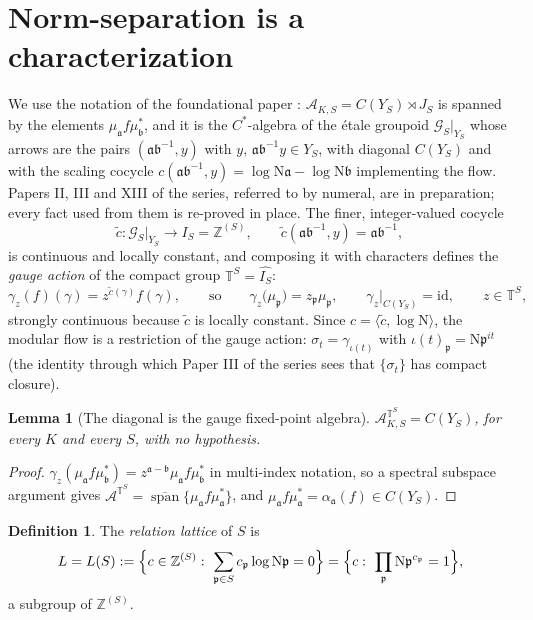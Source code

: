 \documentclass[11pt]{amsart}
\numberwithin{equation}{section}
\newtheorem{lemma}[theorem]{Lemma}
\theoremstyle{definition}
\newtheorem{definition}[theorem]{Definition}
\theoremstyle{remark}
\newcommand{\Z}{\mathbb{Z}}
\newcommand{\T}{\mathbb{T}}
\newcommand{\cA}{\mathcal{A}}
\newcommand{\cG}{\mathcal{G}}
\newcommand{\pp}{\mathfrak{p}}
\newcommand{\aaa}{\mathfrak{a}}
\newcommand{\bb}{\mathfrak{b}}
\newcommand{\Ns}{\mathrm{N}}
\newcommand{\spn}{\operatorname{span}}
\newcommand{\id}{\mathrm{id}}
\begin{document}
\maketitle

\section{Norm-separation is a characterization}

We use the notation of the foundational paper \cite{Main}: $\cA_{K,S}=C(Y_S)\rtimes J_S$ is
spanned by the elements $\mu_\aaa f\mu_\bb^*$, and it is the $C^*$-algebra of the \'etale
groupoid $\cG_S|_{Y_S}$ whose arrows are the pairs $(\aaa\bb^{-1},y)$ with
$y,\,\aaa\bb^{-1}y\in Y_S$, with diagonal $C(Y_S)$ and with the scaling cocycle
$c(\aaa\bb^{-1},y)=\log\Ns\aaa-\log\Ns\bb$ implementing the flow. Papers II, III and XIII of
the series, referred to by numeral, are in preparation; every fact used from them is
re-proved in place. The finer, integer-valued cocycle
\[
\widetilde c:\cG_S|_{Y_S}\longrightarrow I_S=\Z^{(S)},\qquad
\widetilde c(\aaa\bb^{-1},y)=\aaa\bb^{-1},
\]
is continuous and locally constant, and composing it with characters defines the
\emph{gauge action} of the compact group $\T^S=\widehat{I_S}$:
\[
\gamma_z(f)(\gamma)=z^{\widetilde c(\gamma)}f(\gamma),\qquad\text{so}\qquad
\gamma_z\bigl(\mu_\pp\bigr)=z_\pp\mu_\pp,\qquad \gamma_z|_{C(Y_S)}=\id,\qquad z\in\T^S,
\]
strongly continuous because $\widetilde c$ is locally constant. Since
$c=\langle\widetilde c,\log\Ns\rangle$, the modular flow is a restriction of the gauge
action: $\sigma_t=\gamma_{\iota(t)}$ with $\iota(t)_\pp=\Ns\pp^{it}$ (the identity through
which Paper III of the series sees that $\{\sigma_t\}$ has compact closure).

\begin{lemma}[The diagonal is the gauge fixed-point algebra]\label{lem:gauge}
$\cA_{K,S}^{\T^S}=C(Y_S)$, for every $K$ and every $S$, with no hypothesis.
\end{lemma}

\begin{proof}
$\gamma_z(\mu_\aaa f\mu_\bb^*)=z^{\aaa-\bb}\mu_\aaa f\mu_\bb^*$ in multi-index notation, so a
spectral subspace argument gives $\cA^{\T^S}=\overline{\spn}\{\mu_\aaa f\mu_\aaa^*\}$, and
$\mu_\aaa f\mu_\aaa^*=\alpha_\aaa(f)\in C(Y_S)$.
\end{proof}

\begin{definition}\label{def:L}
The \emph{relation lattice} of $S$ is
\[
L=L(S):=\Bigl\{c\in\Z^{(S)}:\ \sum_{\pp\in S}c_\pp\log\Ns\pp=0\Bigr\}
=\Bigl\{c:\ \prod_\pp\Ns\pp^{c_\pp}=1\Bigr\},
\]
a subgroup of $\Z^{(S)}$.
\end{definition}
\end{document}
